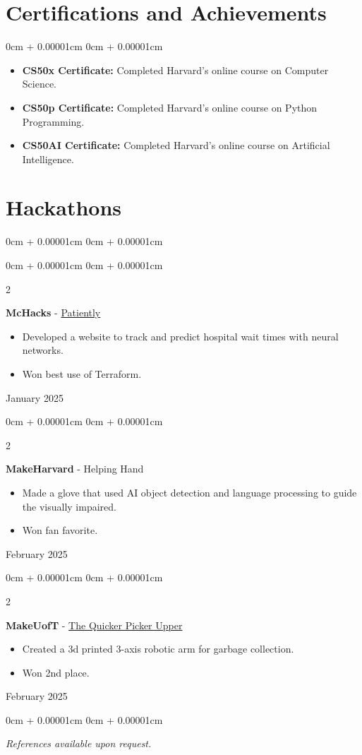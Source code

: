 \documentclass[10pt, letterpaper]{article}
\newenvironment{highlights}{
    \begin{itemize}[
        topsep=0.10cm,
        parsep=0.10cm,
        partopsep=0pt,
        itemsep=0pt,
        leftmargin=0cm + 10pt
    ]
}{
    \end{itemize}
}
\newenvironment{onecolentry}{
    \begin{adjustwidth}{
        0cm + 0.00001cm
    }{
        0cm + 0.00001cm
    }
}{
    \end{adjustwidth}
}
\newenvironment{twocolentry}[2][]{
    \onecolentry
    \def\secondColumn{#2}
    \setcolumnwidth{\fill, 5.5 cm} %
    \begin{paracol}{2}
}{
    \switchcolumn \raggedleft \secondColumn
    \end{paracol}
    \endonecolentry
}
\begin{document}
    \section{Certifications and Achievements}
    \begin{onecolentry}
        \begin{highlights}
            \item \textbf{CS50x Certificate:} Completed Harvard's online course on Computer Science.
            \item \textbf{CS50p Certificate:} Completed Harvard's online course on Python Programming.
            \item \textbf{CS50AI Certificate:} Completed Harvard's online course on Artificial Intelligence.
        \end{highlights}
    \end{onecolentry}

    \section{Hackathons}
    \begin{onecolentry}
        \begin{twocolentry}{January 2025}
            \textbf{McHacks} - \href{https://devpost.com/software/patiently-waiting}{Patiently}
            \begin{highlights}
            \item Developed a website to track and predict hospital wait times with neural networks. 
            \item Won best use of Terraform.
            \end{highlights}
            
        \end{twocolentry}

        \begin{twocolentry}{February 2025}
            \textbf{MakeHarvard} - Helping Hand 
            \begin{highlights}
            \item Made a glove that used AI object detection and language processing to guide the visually impaired. 
            \item Won fan favorite. 
            \end{highlights}
        \end{twocolentry}

        \begin{twocolentry}{February 2025}
            \textbf{MakeUofT} - \href{https://devpost.com/software/the-quicker-picker-upper}{The Quicker Picker Upper}
            \begin{highlights}
            \item Created a 3d printed 3-axis robotic arm for garbage collection. 
            \item Won 2nd place. 
            \end{highlights}
            
         \end{twocolentry}

    \end{onecolentry}

    \vspace{0.2cm}

    \begin{onecolentry}
        \textit{References available upon request.}
    \end{onecolentry}
\end{document}
